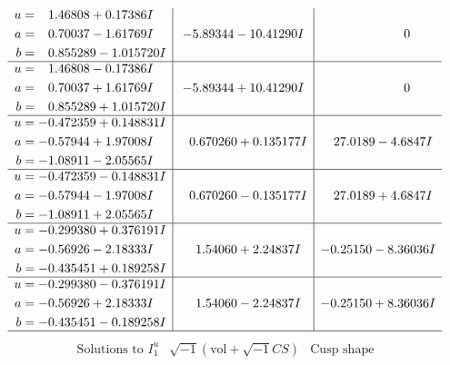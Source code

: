 \documentclass[1p]{elsarticle_modified}
\theoremstyle{definition}
\newcommand{\I}{\sqrt{-1}}
\begin{document}
$$\begin{array}{c|c|c}
\begin{aligned}
u &= \phantom{-}1.46808 + 0.17386 I \\
a &= \phantom{-}0.70037 - 1.61769 I \\
b &= \phantom{-}0.855289 - 1.015720 I\end{aligned}
 & -5.89344 - 10.41290 I & \phantom{-0.000000 } 0 \\ \hline\begin{aligned}
u &= \phantom{-}1.46808 - 0.17386 I \\
a &= \phantom{-}0.70037 + 1.61769 I \\
b &= \phantom{-}0.855289 + 1.015720 I\end{aligned}
 & -5.89344 + 10.41290 I & \phantom{-0.000000 } 0 \\ \hline\begin{aligned}
u &= -0.472359 + 0.148831 I \\
a &= -0.57944 + 1.97008 I \\
b &= -1.08911 - 2.05565 I\end{aligned}
 & \phantom{-}0.670260 + 0.135177 I & \phantom{-}27.0189 - 4.6847 I \\ \hline\begin{aligned}
u &= -0.472359 - 0.148831 I \\
a &= -0.57944 - 1.97008 I \\
b &= -1.08911 + 2.05565 I\end{aligned}
 & \phantom{-}0.670260 - 0.135177 I & \phantom{-}27.0189 + 4.6847 I \\ \hline\begin{aligned}
u &= -0.299380 + 0.376191 I \\
a &= -0.56926 - 2.18333 I \\
b &= -0.435451 + 0.189258 I\end{aligned}
 & \phantom{-}1.54060 + 2.24837 I & -0.25150 - 8.36036 I \\ \hline\begin{aligned}
u &= -0.299380 - 0.376191 I \\
a &= -0.56926 + 2.18333 I \\
b &= -0.435451 - 0.189258 I\end{aligned}
 & \phantom{-}1.54060 - 2.24837 I & -0.25150 + 8.36036 I\\
 \hline 
 \end{array}$$\newpage$$\begin{array}{c|c|c}  
\text{Solutions to }I^u_{1}& \I (\text{vol} + \sqrt{-1}CS) & \text{Cusp shape}\\
 \hline 
\begin{aligned}

\end{aligned}
\end{array}$$
\end{document}
